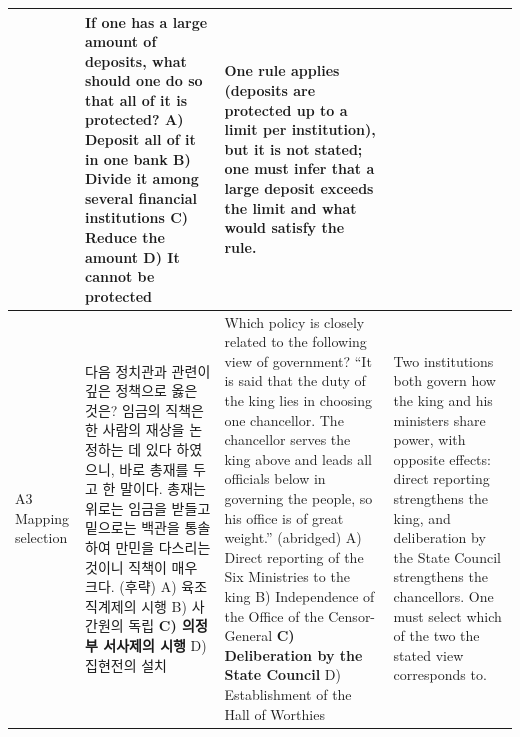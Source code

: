 \begin{table}[t]
\begin{tabular}{@{}p{}p{}p{}p{}@{}}
& If one has a large amount of deposits, what should one do so that all of it is protected?
\newline A) Deposit all of it in one bank
\newline \textbf{B) Divide it among several financial institutions}
\newline C) Reduce the amount
\newline D) It cannot be protected
& One rule applies (deposits are protected up to a limit per institution), but it is not stated; one must infer that a large deposit exceeds the limit and what would satisfy the rule. \\
\midrule
A3 \newline Mapping selection
& 다음 정치관과 관련이 깊은 정책으로 옳은 것은?
\newline 임금의 직책은 한 사람의 재상을 논정하는 데 있다 하였으니, 바로 총재를 두고 한 말이다. 총재는 위로는 임금을 받들고 밑으로는 백관을 통솔하여 만민을 다스리는 것이니 직책이 매우 크다. (후략)
\newline A) 육조 직계제의 시행
\newline B) 사간원의 독립
\newline \textbf{C) 의정부 서사제의 시행}
\newline D) 집현전의 설치
& Which policy is closely related to the following view of government?
\newline ``It is said that the duty of the king lies in choosing one chancellor. The chancellor serves the king above and leads all officials below in governing the people, so his office is of great weight.'' (abridged)
\newline A) Direct reporting of the Six Ministries to the king
\newline B) Independence of the Office of the Censor-General
\newline \textbf{C) Deliberation by the State Council}
\newline D) Establishment of the Hall of Worthies
& Two institutions both govern how the king and his ministers share power, with opposite effects: direct reporting strengthens the king, and deliberation by the State Council strengthens the chancellors. One must select which of the two the stated view corresponds to. \\
\bottomrule
\end{tabular}
\end{table}